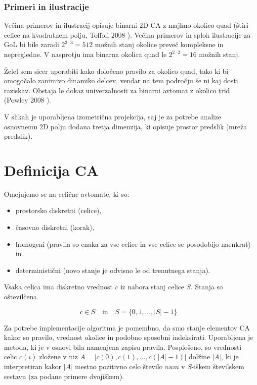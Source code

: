 \documentclass[12pt,a4paper,openany,twoside]{book}
\begin{document}
\subsection{Primeri in ilustracije}

Večina primerov in ilustracij opisuje binarni 2D CA z majhno okolico quad
(štiri celice na kvadratnem polju, Toffoli 2008 \cite{Toffoli2008}).
Večina primerov in sploh ilustracije za GoL bi bile zaradi
\(2^{3 \cdot 3}=512\) možnih stanj okolice preveč kompleksne in nepregledne.
V nasprotju ima binarna okolica quad le \(2^{2 \cdot 2}=16\) možnih stanj.

Želel sem sicer uporabiti kako določeno pravilo za okolico quad,
tako ki bi omogočalo zanimivo dinamiko delcev, vendar na tem področju še ni kaj dosti raziskav.
Obstaja le dokaz univerzalnosti za binarni avtomat z okolico trid (Powley 2008 \cite{Powley2008}).

V slikah je uporabljena izometrična projekcija,
saj je za potrebe analize osnovnemu 2D polju dodana tretja dimenzija,
ki opisuje prostor predslik (mreža predslik).

\chapter{Definicija CA}

Omejujemo se na celične avtomate, ki so:
\begin{itemize}
\item prostorsko diskretni (celice),
\item časovno diskretni (korak),
\item homogeni (pravila so enaka za vse celice in vse celice se posodobijo naenkrat) in
\item deterministični (novo stanje je odvisno le od trenutnega stanja).
\end{itemize}

Vsaka celica ima diskretno vrednost \(c\) iz nabora stanj celice \(S\).
Stanja so oštevilčena.

\begin{equation}
c \in S
\quad \textrm{in} \quad
S = \{ 0, 1, \ldots, |S|-1 \}
\end{equation}

Za potrebe implementacije algoritma je pomembno,
da smo stanje elementov CA kakor so pravilo, vrednost okolice in podobno
sposobni indeksirati.
Uporabljena je metoda, ki je v osnovi bila namenjena zapisu pravila.
Posplošeno, so vrednosti celic \(c(i)\) zložene v niz \(A=[c(0),c(1), \ldots, c(|A|-1)\)] dolžine \(|A|\),
ki je interpretiran kakor \(|A|\) mestno pozitivno celo število \(num\) v
\(S\)-iškem številskem sestavu (za podane primere dvojiškem).
\end{document}
